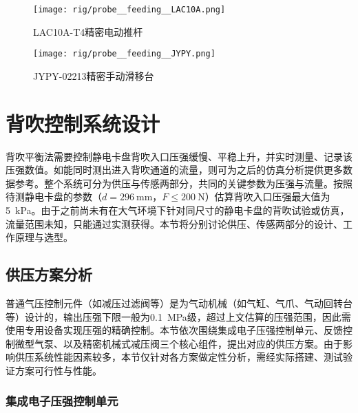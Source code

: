\begin{figure}[tbh]
\centering
\texttt{[image: rig/probe\_\_feeding\_\_LAC10A.png]}
\caption{LAC10A-T4精密电动推杆}
\label{fig:rig-probe-feeding-LAC10A}
\end{figure}

\begin{figure}[tbh]
\centering
\texttt{[image: rig/probe\_\_feeding\_\_JYPY.png]}
\caption{JYPY-02213精密手动滑移台}
\label{fig:rig-probe-feeding-JYPY}
\end{figure}



\clearpage



\section{背吹控制系统设计}\label{sec:rig-pressure}

背吹平衡法需要控制静电卡盘背吹入口压强缓慢、平稳上升，并实时测量、记录该压强数值。如能同时测出进入背吹通道的流量，则可为之后的仿真分析提供更多数据参考。整个系统可分为供压与传感两部分，共同的关键参数为压强与流量。按照待测静电卡盘的参数（$d = \SI{296}{\mm}$，$F \leq \SI{200}{\N}$）估算背吹入口压强最大值为\SI{5}{\kPa}\footnotemark{}。由于之前尚未有在大气环境下针对同尺寸的静电卡盘的背吹试验或仿真，流量范围未知，只能通过实测获得。本节将分别讨论供压、传感两部分的设计、工作原理与选型。



\subsection{供压方案分析}\label{sec:rig-pressure-supply}

普通气压控制元件（如减压过滤阀等）是为气动机械（如气缸、气爪、气动回转台等）设计的，输出压强下限一般为\SI{0.1}{\MPa}级，超过上文估算的压强范围，因此需使用专用设备实现压强的精确控制。本节依次围绕集成电子压强控制单元、反馈控制微型气泵、以及精密机械式减压阀三个核心组件，提出对应的供压方案。由于影响供压系统性能因素较多，本节仅针对各方案做定性分析，需经实际搭建、测试验证方案可行性与性能。

\subsubsection{集成电子压强控制单元}\label{sec:rig-pressure-supply-integrated}

